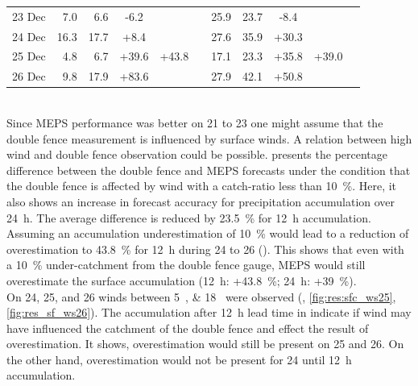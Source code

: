 \begin{table}[t]
\begin{center}
\begin{tabular}{c||r|r|c|c|c||r|r|c|c|c}
			\num{23} Dec & \num{7.0} & \num{6.6} & -\num{6.2} & & & \num{25.9} & \num{23.7} & -\num{8.4} &  &  \\\cline{1-5}\cline{7-10}
			\num{24} Dec & \num{16.3} & \num{17.7} & +\num{8.4} & \multirow{3}{*}{+\num{43.8}} & & \num{27.6} & \num{35.9} & +\num{30.3} & \multirow{3}{*}{+\num{39.0}}  &  \\\cline{1-4}\cline{7-9}
			\num{25} Dec & \num{4.8} & \num{6.7} & +\num{39.6} & & & \num{17.1} & \num{23.3} & +\num{35.8} & &   \\\cline{1-4}\cline{7-9}
			\num{26} Dec & \num{9.8} & \num{17.9} & +\num{83.6} & & & \num{27.9} & \num{42.1} & +\num{50.8} &  &  \\\hline\hline
		\end{tabular}
	\end{center}
\end{table}
\noindent
\\
Since MEPS performance was better on \num{21} to \SI{23}{\dec} one might assume that the double fence measurement is influenced by surface winds. 
A relation between high wind and double fence observation could be possible.  presents the percentage difference between the double fence and MEPS forecasts under the condition that the double fence is affected by wind with a catch-ratio less than \SI{10}{\percent}. Here, it also shows an increase in forecast accuracy for precipitation accumulation over \SI{24}{\hour}.
The average difference is reduced by \SI{23.5}{\percent} for \SI{12}{\hour} accumulation. Assuming an accumulation underestimation of \SI{10}{\percent} would lead to a reduction of overestimation to \SI{43.8}{\percent} for \SI{12}{\hour} during \num{24} to \SI{26}{\dec} ().
This shows that even with a \SI{10}{\percent} under-catchment from the double fence gauge, MEPS would still overestimate the surface accumulation (\SI{12}{\hour}: +\SI{43.8}{\percent}; \SI{24}{\hour}: +\SI{39}{\percent}). 
\\
On \num{24}, \num{25}, and \SI{26}{\dec} winds between \SIlist{5;18}{\mPs} were observed (, \ref{fig:res:sfc_ws25}, \ref{fig:res_sf_ws26}). The accumulation after \SI{12}{\hour} lead time in  indicate if wind may have influenced the catchment of the double fence and effect the result of overestimation. It shows, overestimation would still be present on \num{25} and \SI{26}{\dec}. On the other hand, overestimation would not be present for \SI{24}{\dec} until \SI{12}{\hour} accumulation.

